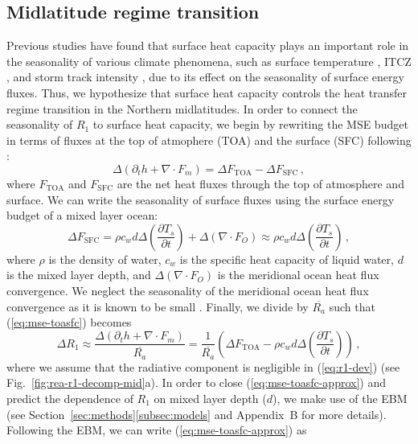 \documentclass{ametsocV5}
\begin{document}
  \subsection{Midlatitude regime transition} \label{subsec:mld}
  Previous studies have found that surface heat capacity plays an important role in the seasonality of various climate phenomena, such as surface temperature \citep{donohoe2014}, ITCZ \citep{bordoni2008}, and storm track intensity \citep{barpanda2020}, due to its effect on the seasonality of surface energy fluxes. Thus, we hypothesize that surface heat capacity controls the heat transfer regime transition in the Northern midlatitudes. In order to connect the seasonality of $R_1$ to surface heat capacity, we begin by rewriting the MSE budget in terms of fluxes at the top of atmophere (TOA) and the surface (SFC) following \cite{barpanda2020}:
  \begin{equation}\label{eq:mse-toasfc}
    \Delta\left(\partial_t h + \nabla\cdot F_{m} \right) = \Delta F_{\mathrm{TOA}} - \Delta F_{\mathrm{SFC}} \, ,
  \end{equation}
  where \(F_{\mathrm{TOA}}\) and \(F_{\mathrm{SFC}}\) are the net heat fluxes through the top of atmosphere and surface. We can write the seasonality of surface fluxes using the surface energy budget of a mixed layer ocean:
  \begin{equation}
    \Delta F_{\mathrm{SFC}} = \rho c_{w} d \Delta\left(\frac{\partial T_{s}}{\partial t}\right) + \Delta ( \nabla\cdot F_{O}) \approx \rho c_{w} d \Delta\left(\frac{\partial T_{s}}{\partial t}\right) \, ,
  \end{equation}
  where $\rho$ is the density of water, $c_w$ is the specific heat capacity of liquid water, $d$ is the mixed layer depth, and $\Delta(\nabla\cdot F_O)$ is the meridional ocean heat flux convergence. We neglect the seasonality of the meridional ocean heat flux convergence as it is known to be small \citep{roberts2017}. Finally, we divide by $\overline{R_a}$ such that (\ref{eq:mse-toasfc}) becomes
  \begin{equation}\label{eq:mse-toasfc-approx}
    \Delta R_1 \approx \frac{\Delta\left(\partial_t h + \nabla\cdot F_{m} \right)}{\overline{R_a}} = \frac{1}{\overline{R_a}} \left(\Delta F_{\mathrm{TOA}} - \rho c_{w} d \Delta\left(\frac{\partial T_{s}}{\partial t}\right)\right) \, , 
  \end{equation}
  where we assume that the radiative component is negligible in (\ref{eq:r1-dev}) (see Fig.~\ref{fig:rea-r1-decomp-mid}a). In order to close (\ref{eq:mse-toasfc-approx}) and predict the dependence of $R_1$ on mixed layer depth ($d$), we make use of the EBM (see Section~\ref{sec:methods}\ref{subsec:models} and Appendix~B for more details). Following the EBM, we can write (\ref{eq:mse-toasfc-approx}) as
\end{document}
